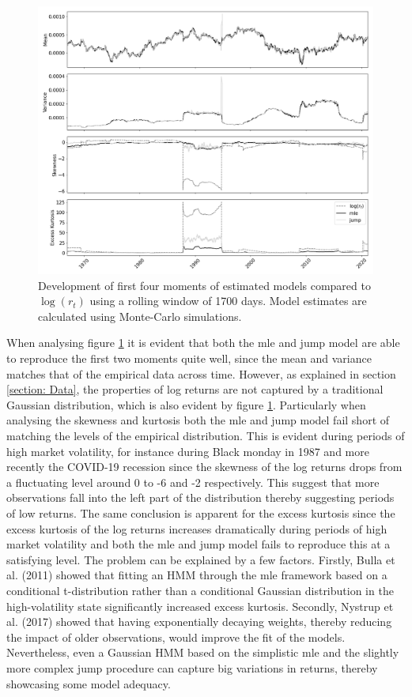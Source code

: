 \begin{figure}[H] 
    \centering
    \includegraphics[width=1.0\textwidth]{analysis/stylized_facts/images/rolling_moments.png}
    \caption{Development of first four moments of estimated models compared to $\log(r_t)$ using a rolling window of 1700 days. Model estimates are calculated using Monte-Carlo simulations.}
    \label{fig:stylized_facts_rolling_moments} 
\end{figure}

When analysing figure \ref{fig:stylized_facts_rolling_moments} it is evident that both the mle and jump model are able to reproduce the first two moments quite well, since the mean and variance matches that of the empirical data across time. However, as explained in section \ref{section: Data}, the properties of log returns are not captured by a traditional Gaussian distribution, which is also evident by figure \ref{fig:stylized_facts_rolling_moments}. Particularly when analysing the skewness and kurtosis both the mle and jump model fail short of matching the levels of the empirical distribution. This is evident during periods of high market volatility, for instance during Black monday in 1987 and more recently the COVID-19 recession since the skewness of the log returns drops from a fluctuating level around 0 to -6 and -2 respectively. This suggest that more observations fall into the left part of the distribution thereby suggesting periods of low returns. The same conclusion is apparent for the excess kurtosis since the excess kurtosis of the log returns increases dramatically during periods of high market volatility and both the mle and jump model fails to reproduce this at a satisfying level. The problem can be explained by a few factors. Firstly, Bulla et al. (2011) showed that fitting an HMM through the mle framework based on a conditional t-distribution rather than a conditional Gaussian distribution in the high-volatility state significantly increased excess kurtosis. Secondly, Nystrup et al. (2017) showed that having exponentially decaying weights, thereby reducing the impact of older observations, would improve the fit of the models. Nevertheless, even a Gaussian HMM based on the simplistic mle and the slightly more complex jump procedure can capture big variations in returns, thereby showcasing some model adequacy.

